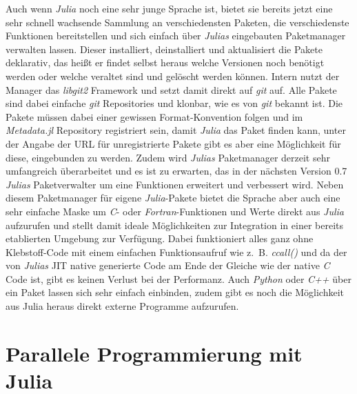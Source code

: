 \documentclass[proseminar,german,utf8]{zihpub}
\begin{document}
Auch wenn \textit{Julia} noch eine sehr junge Sprache ist, bietet sie bereits jetzt eine sehr schnell wachsende Sammlung an verschiedensten Paketen, die verschiedenste Funktionen bereitstellen und sich einfach über \textit{Julias} eingebauten Paketmanager verwalten lassen. Dieser installiert, deinstalliert und aktualisiert die Pakete deklarativ, das heißt er findet selbst heraus welche Versionen noch benötigt werden oder welche veraltet sind und gelöscht werden können. Intern nutzt der Manager das \textit{libgit2} Framework und setzt damit direkt auf \textit{git} auf. Alle Pakete sind dabei einfache \textit{git} Repositories und klonbar, wie es von \textit{git} bekannt ist. Die Pakete müssen dabei einer gewissen Format-Konvention folgen und im \textit{Metadata.jl} Repository registriert sein, damit \textit{Julia} das Paket finden kann, unter der Angabe der URL für unregistrierte Pakete gibt es aber eine Möglichkeit für diese, eingebunden zu werden. Zudem wird \textit{Julias} Paketmanager derzeit sehr umfangreich überarbeitet und es ist zu erwarten, das in der nächsten Version 0.7 \textit{Julias} Paketverwalter um eine Funktionen erweitert und verbessert wird. Neben diesem Paketmanager für eigene \textit{Julia}-Pakete bietet die Sprache aber auch eine sehr einfache Maske um \textit{C}- oder \textit{Fortran}-Funktionen und Werte direkt aus \textit{Julia} aufzurufen und stellt damit ideale Möglichkeiten zur Integration in einer bereits etablierten Umgebung zur Verfügung. Dabei funktioniert alles ganz ohne Klebstoff-Code mit einem einfachen Funktionsaufruf wie z.~B. \textit{ccall()} und da der von \textit{Julias} JIT native generierte Code am Ende der Gleiche wie der native \textit{C} Code ist, gibt es keinen Verlust bei der Performanz. Auch \textit{Python} oder \textit{C++} über ein Paket lassen sich sehr einfach einbinden, zudem gibt es noch die Möglichkeit aus Julia heraus direkt externe Programme aufzurufen.

\section{Parallele Programmierung mit Julia}
\end{document}
